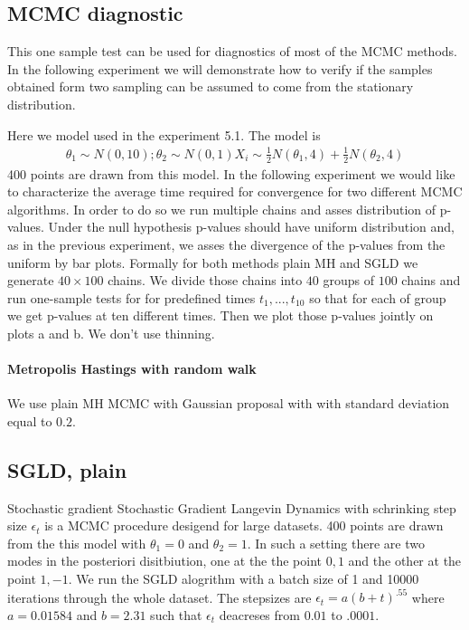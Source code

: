 \documentclass{article}
\begin{document}
\subsection{MCMC diagnostic}
This one sample test can be used for diagnostics of most of the MCMC methods. In the following experiment we will demonstrate how to verify if the samples obtained form two sampling can be assumed to come from the stationary distribution.  

Here we model used in the experiment 5.1. The model is 
\begin{align}
 \theta_1 \sim N(0,10) ; \theta_2 \sim N(0,1)
 X_i \sim \frac {1}{2} N(\theta_1,4) + \frac{1}{2} N(\theta_2,4) 
\end{align}
400 points are drawn from this model. In the following experiment we would like to characterize the average time required for convergence for two different MCMC algorithms. In order to do so we run multiple chains and asses distribution of p-values. Under the null hypothesis p-values should have uniform distribution and, as in the previous experiment, we asses the divergence of the p-values from the uniform by bar plots. Formally for both methods plain MH and SGLD we generate $40 \times 100$ chains. We divide those chains into $40$ groups of $100$ chains and run one-sample tests for for predefined times $t_1,...,t_10$  so that for each of group we get p-values at ten different times. Then we plot those p-values jointly on plots a and b. We don't use thinning.  


\paragraph{Metropolis Hastings with random walk}
We use plain MH MCMC with Gaussian proposal with with standard deviation equal to  $0.2$.   

\subsection{SGLD, plain }
Stochastic gradient  Stochastic Gradient Langevin Dynamics  with schrinking step size $\epsilon_t$ is a MCMC procedure desigend for large datasets. 
400 points are drawn from the this model with $\theta_1 = 0$ and $\theta_2= 1$. In such a setting there are two modes in the posteriori disitbiution, one at the the point $0,1$ and the other at the point $1,-1$. We run the SGLD alogrithm with a batch size of 1 and 10000 iterations through the whole dataset. The stepsizes are $\epsilon_t = a(b+t)^{.55}$ where $ a = 0.01584$ and $b=2.31$ such that $\epsilon_t$ deacreses from $0.01$ to $.
0001$. 
\end{document}
